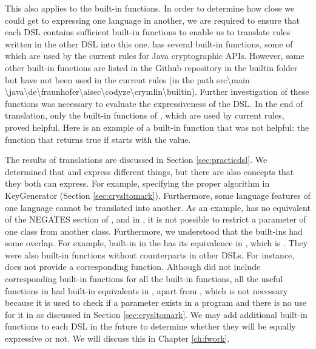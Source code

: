 This also applies to the built-in functions. In order to determine how close we could get to expressing one language in another, we are required to ensure that each DSL contains sufficient built-in functions to enable us to translate rules written in the other DSL into this one. \MARK{} has several built-in functions, some of which are used by the current \MARK{} rules for Java cryptographic APIs. However, some other \MARK{} built-in functions are listed in the \codyze{} Github repository \cite{codyzegit} in the builtin folder but have not been used in the current \MARK{} rules (in the path src\textbackslash main \textbackslash java\textbackslash de\textbackslash fraunhofer\textbackslash aisec\textbackslash codyze\textbackslash crymlin\textbackslash builtin). Further investigation of these functions was necessary to evaluate the expressiveness of the \MARK{} DSL. In the end of translation, only the built-in functions of \MARK, which are used by current \MARK{} rules, proved helpful. Here is an example of a built-in function that was not helpful: the  function that returns true if  starts with the  value.

The results of translations are discussed in Section \ref{sec:practicdsl}. We determined that \crysl{} and \MARK{} express different things, but there are also concepts that they both can express. For example, specifying the proper algorithm in KeyGenerator (Section \ref{sec:crysltomark}). Furthermore, some language features of one language cannot be translated into another. As an example, \MARK{} has no equivalent of the NEGATES section of \crysl, and in \crysl, it is not possible to restrict a parameter of one class from another class. Furthermore, we understood that the built-ins had some overlap. For example,  built-in in the \MARK{} has its equivalence in \crysl, which is . They were also built-in functions without counterparts in other DSLs. For instance, \MARK{} does not provide a corresponding  function. Although \crysl{} did not include corresponding built-in functions for all the \MARK{} built-in functions, all the useful functions in \MARK{} had built-in equivalents in \crysl, apart from , which is not necessary because it is used to check if a parameter exists in a program and there is no use for it in \crysl{} as discussed in Section \ref{sec:crysltomark}. We may add additional built-in functions to each DSL in the future to determine whether they will be equally expressive or not. We will discuss this in Chapter \ref{ch:fwork}.


